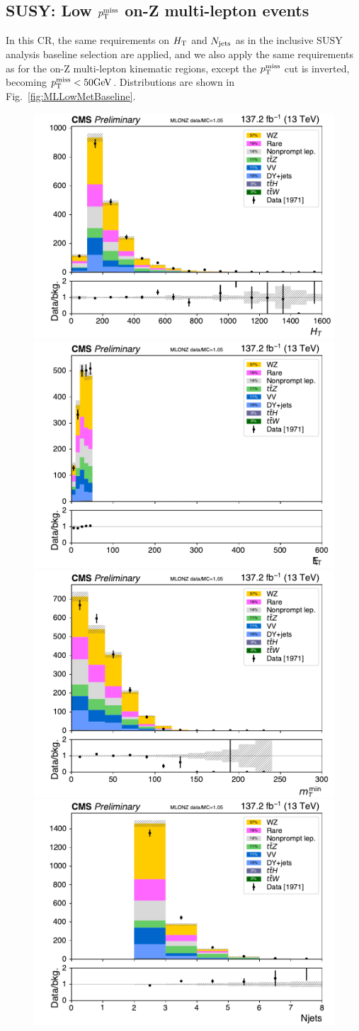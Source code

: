 \FloatBarrier

\subsection{SUSY: Low $p_{\mathrm{T}}^\text{miss}$ on-Z multi-lepton events}\label{LowMetOnZCR}

In this CR, the same requirements on $H_{\mathrm{T}}$
and $N_\text{jets}$ as in the inclusive SUSY analysis baseline selection are applied,
and we also apply the same requirements
as for the on-Z multi-lepton kinematic regions, except the $p_{\mathrm{T}}^\text{miss}$ cut is inverted, 
becoming $p_{\mathrm{T}}^\text{miss} < 50 \text{GeV}$.
Distributions are shown in Fig.~\ref{fig:MLLowMetBaseline}.

\begin{figure}[!htb]
\centering
\includegraphics[width=0.45\linewidth]{figs/ssan/cr/run2_mlonz_ht_in.pdf} 
\includegraphics[width=0.45\linewidth]{figs/ssan/cr/run2_mlonz_met_in.pdf} 
\includegraphics[width=0.45\linewidth]{figs/ssan/cr/run2_mlonz_mtmin_in.pdf}
\includegraphics[width=0.45\linewidth]{figs/ssan/cr/run2_mlonz_njets_in.pdf} 

\end{figure}
